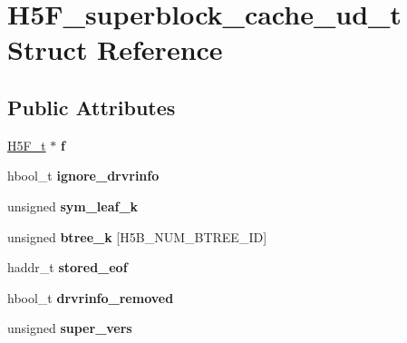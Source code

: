 \hypertarget{struct_h5_f__superblock__cache__ud__t}{}\section{H5\+F\+\_\+superblock\+\_\+cache\+\_\+ud\+\_\+t Struct Reference}
\label{struct_h5_f__superblock__cache__ud__t}
\subsection*{Public Attributes}
\begin{DoxyCompactItemize}
\item 
\mbox{\label{struct_h5_f__superblock__cache__ud__t_a1456d9167edddd0de067fec3e386bf32}} 
\hyperlink{struct_h5_f__t}{H5\+F\+\_\+t} $\ast$ {\bfseries f}
\item 
\mbox{\label{struct_h5_f__superblock__cache__ud__t_aecd77d1bed8671bcfb036e7162706c6b}} 
hbool\+\_\+t {\bfseries ignore\+\_\+drvrinfo}
\item 
\mbox{\label{struct_h5_f__superblock__cache__ud__t_adf015d27e7140dbdb22a170e627753f6}} 
unsigned {\bfseries sym\+\_\+leaf\+\_\+k}
\item 
\mbox{\label{struct_h5_f__superblock__cache__ud__t_a0557275a7adf3a217803027a2d998861}} 
unsigned {\bfseries btree\+\_\+k} \mbox{[}H5\+B\+\_\+\+N\+U\+M\+\_\+\+B\+T\+R\+E\+E\+\_\+\+ID\mbox{]}
\item 
\mbox{\label{struct_h5_f__superblock__cache__ud__t_a916fb1de1dd7c1ef8ca1f9dc844a47a9}} 
haddr\+\_\+t {\bfseries stored\+\_\+eof}
\item 
\mbox{\label{struct_h5_f__superblock__cache__ud__t_a545f1ba726b287935fdae612fc4f56fb}} 
hbool\+\_\+t {\bfseries drvrinfo\+\_\+removed}
\item 
\mbox{\label{struct_h5_f__superblock__cache__ud__t_a40fd905e34b9875b2762d9b9f7a967c4}} 
unsigned {\bfseries super\+\_\+vers}
\end{DoxyCompactItemize}



